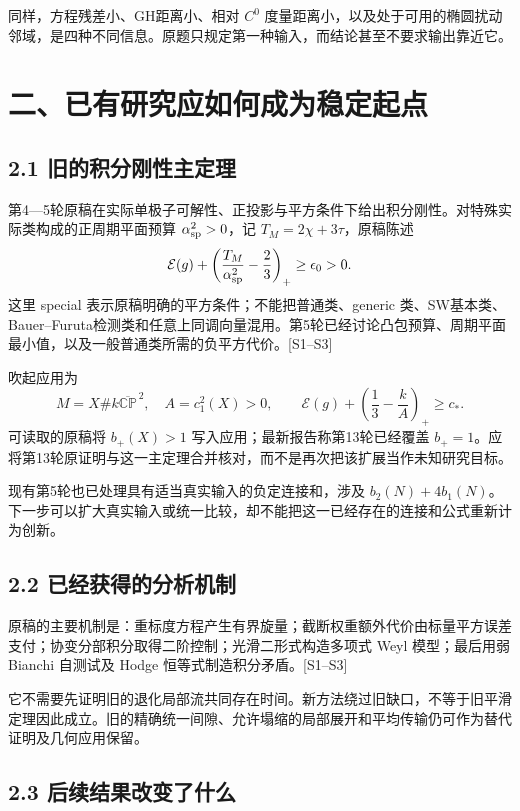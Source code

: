 \documentclass[
  11pt,
  a4paper,
  fontset=none]{ctexart}
\begin{document}
同样，方程残差小、GH距离小、相对 \(C^0\)
度量距离小，以及处于可用的椭圆扰动邻域，是四种不同信息。原题只规定第一种输入，而结论甚至不要求输出靠近它。

\section{二、已有研究应如何成为稳定起点}\label{ux4e8cux5df2ux6709ux7814ux7a76ux5e94ux5982ux4f55ux6210ux4e3aux7a33ux5b9aux8d77ux70b9}

\subsection{2.1
旧的积分刚性主定理}\label{ux65e7ux7684ux79efux5206ux521aux6027ux4e3bux5b9aux7406}

第4---5轮原稿在实际单极子可解性、正投影与平方条件下给出积分刚性。对特殊实际类构成的正周期平面预算
\(\alpha_{\rm sp}^2>0\)，记 \(T_M=2\chi+3\tau\)，原稿陈述 \[
\mathcal E(g)+\left(\frac{T_M}{\alpha_{\rm sp}^2}-\frac23\right)_+
\ge\epsilon_0>0.
\] 这里 special 表示原稿明确的平方条件；不能把普通类、generic
类、SW基本类、Bauer--Furuta检测类和任意上同调向量混用。第5轮已经讨论凸包预算、周期平面最小值，以及一般普通类所需的负平方代价。{[}S1--S3{]}

吹起应用为 \[
M=X\#k\overline{\mathbb{CP}}^{\,2},\quad A=c_1^2(X)>0,
\qquad
\mathcal E(g)+\left(\frac13-\frac{k}{A}\right)_+\ge c_*.
\] 可读取的原稿将 \(b_+(X)>1\) 写入应用；最新报告称第13轮已经覆盖
\(b_+=1\)。应将第13轮原证明与这一主定理合并核对，而不是再次把该扩展当作未知研究目标。

现有第5轮也已处理具有适当真实输入的负定连接和，涉及
\(b_2(N)+4b_1(N)\)。下一步可以扩大真实输入或统一比较，却不能把这一已经存在的连接和公式重新计为创新。

\subsection{2.2
已经获得的分析机制}\label{ux5df2ux7ecfux83b7ux5f97ux7684ux5206ux6790ux673aux5236}

原稿的主要机制是：重标度方程产生有界旋量；截断权重额外代价由标量平方误差支付；协变分部积分取得二阶控制；光滑二形式构造多项式
Weyl 模型；最后用弱 Bianchi 自测试及 Hodge
恒等式制造积分矛盾。{[}S1--S3{]}

它不需要先证明旧的退化局部流共同存在时间。新方法绕过旧缺口，不等于旧平滑定理因此成立。旧的精确统一间隙、允许塌缩的局部展开和平均传输仍可作为替代证明及几何应用保留。

\subsection{2.3
后续结果改变了什么}\label{ux540eux7eedux7ed3ux679cux6539ux53d8ux4e86ux4ec0ux4e48}
\end{document}
